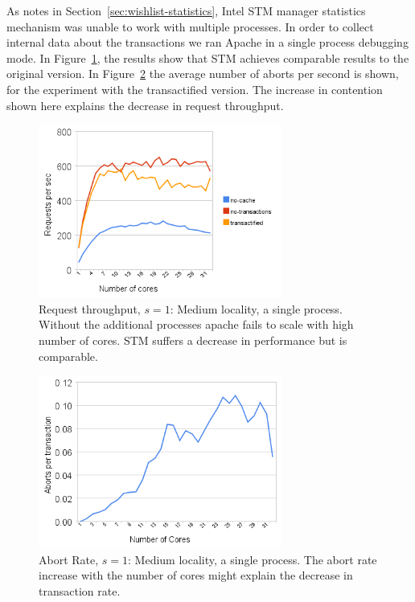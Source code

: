 \documentclass[preprint,11pt]{sigplanconf}
\begin{document}
As notes in Section~\ref{sec:wishlist-statistics}, Intel STM manager statistics
mechanism was unable to work with multiple processes. In order to collect
internal data about the transactions we ran Apache in a single process debugging
mode. In Figure~\ref{fig:one-process-request-throughput}, the results show that
STM achieves comparable results to the original version. In
Figure~\ref{fig:one-process-abort-rate} the average number of aborts per second
is shown, for the experiment with the transactified version. The increase in
contention shown here explains the decrease in request throughput.

\begin{figure}
 \begin{center}
  \includegraphics[width=8cm]{transaction-rate-single-process.png}
 \end{center}
 \caption{Request throughput, $s = 1$: Medium locality, a single process.
          Without the additional processes apache fails to scale with high
          number of cores. STM suffers a decrease in performance but is
          comparable.} 
 \label{fig:one-process-request-throughput}
\end{figure}
\begin{figure}
 \begin{center}
  \includegraphics[width=8cm]{abort-rate.png}
 \end{center}
 \caption{Abort Rate, $s = 1$: Medium locality, a single process.
          The abort rate increase with the number of cores might explain the 
          decrease in transaction rate.}
 \label{fig:one-process-abort-rate}
\end{figure}
\end{document}
